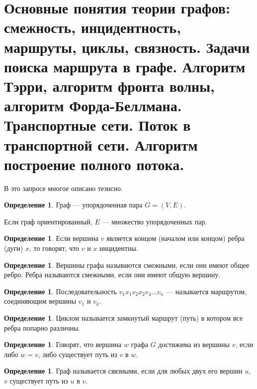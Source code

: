 \documentclass[12pt]{report}
\theoremstyle{definition}
\newtheorem{definition}[theorem]{Определение}
\begin{document}

\section
{
  Основные понятия теории графов: смежность, инцидентность, маршруты, циклы,
  связность. Задачи поиска маршрута в графе. Алгоритм Тэрри, алгоритм фронта волны,
  алгоритм Форда-Беллмана.
  Транспортные сети. Поток в транспортной сети. Алгоритм построение полного потока.
}

В это запросе многое описано тезисно.

\begin{definition}
Граф --- упорядоченная пара $G = (V, E)$.
\end{definition}

Если граф ориентированный, $E$ --- множество упорядоченных пар.

\begin{definition}
Если вершина $v$ является концом (началом или концом)
ребра (дуги) $x$, то говорят, что $v$ и $x$ инцидентны.
\end{definition}

\begin{definition}
Вершины графа называются смежными, если они имеют общее ребро.
Ребра называются смежными, если они имеют общую вершину.
\end{definition}

\begin{definition}
Последовательность $v_1 x_1 v_2 x_2 v_4 \dots v_n$ --- называется
маршрутом, соединяющим вершины $v_1$ и $v_k$.
\end{definition}

\begin{definition}
Циклом называется замкнутый маршрут (путь) в котором
все ребра попарно различны.
\end{definition}

\begin{definition}
Говорят, что вершина $w$ графа $G$ достижима из
вершины $v$, если либо $w = v$, либо существует путь
из $v$ в $w$.
\end{definition}

\begin{definition}
Граф называется связными, если для любых двух его вершин $u$, $v$
существует путь из $u$ в $v$.
\end{definition}
\end{document}
